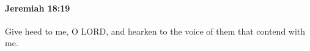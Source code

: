 
		\paragraph{Jeremiah 18:19} %
			\label{JEREMIAH-18-19}

			Give heed to me, O LORD, and hearken to the voice of them that contend with me.


